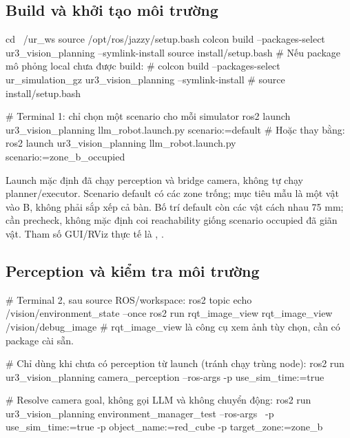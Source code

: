 \documentclass[12pt,a4paper]{article}
\newcommand{\code}[1]{\texttt{\detokenize{#1}}}
\begin{document}
\subsection{Build và khởi tạo môi trường}
\begin{Code}
cd ~/ur_ws
source /opt/ros/jazzy/setup.bash
colcon build --packages-select ur3_vision_planning --symlink-install
source install/setup.bash
# Nếu package mô phỏng local chưa được build:
# colcon build --packages-select ur_simulation_gz ur3_vision_planning --symlink-install
# source install/setup.bash

# Terminal 1: chỉ chọn một scenario cho mỗi simulator
ros2 launch ur3_vision_planning llm_robot.launch.py scenario:=default
# Hoặc thay bằng:
ros2 launch ur3_vision_planning llm_robot.launch.py scenario:=zone_b_occupied
\end{Code}
Launch mặc định đã chạy perception và bridge camera, không tự chạy planner/executor. Scenario default có các zone trống; mục tiêu mẫu là một vật vào B, không phải sắp xếp cả bàn. Bố trí default còn các vật cách nhau 75 mm; cần precheck, không mặc định coi reachability giống scenario occupied đã giãn vật. Tham số GUI/RViz thực tế là \code{gazebo_gui}, \code{launch_rviz}.

\subsection{Perception và kiểm tra môi trường}
\begin{Code}
# Terminal 2, sau source ROS/workspace:
ros2 topic echo /vision/environment_state --once
ros2 run rqt_image_view rqt_image_view /vision/debug_image
# rqt_image_view là công cụ xem ảnh tùy chọn, cần có package cài sẵn.

# Chỉ dùng khi chưa có perception từ launch (tránh chạy trùng node):
ros2 run ur3_vision_planning camera_perception --ros-args -p use_sim_time:=true

# Resolve camera goal, không gọi LLM và không chuyển động:
ros2 run ur3_vision_planning environment_manager_test --ros-args \
  -p use_sim_time:=true -p object_name:=red_cube -p target_zone:=zone_b
\end{Code}
\end{document}
